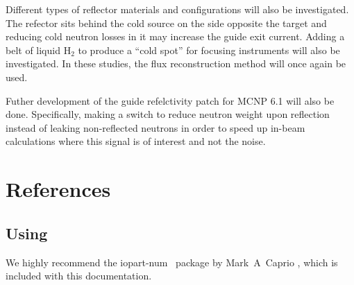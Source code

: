 \documentclass[a4paper]{jpconf}
\begin{document}
Different types of reflector materials and configurations will also be investigated.  The refector sits behind the cold source on the side opposite the target and reducing cold neutron losses in it may increase the guide exit current.  Adding a belt of liquid H$_2$ to produce a ``cold spot'' for focusing instruments will also be investigated.  In these studies, the flux reconstruction method will once again be used.

Futher development of the guide refelctivity patch for MCNP 6.1 will also be done.  Specifically, making a switch to reduce neutron weight upon reflection instead of leaking non-reflected neutrons in order to speed up in-beam calculations where this signal is of interest and not the noise.


\section{References}

\subsection{Using \BibTeX}
We highly recommend the {\ttfamily\textbf\selectfont iopart-num} \BibTeX\ package by Mark~A~Caprio \cite{iopartnum}, which is included with this documentation.
\end{document}
